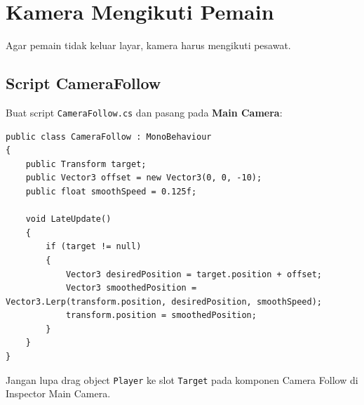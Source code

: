 
\section{Kamera Mengikuti Pemain}

Agar pemain tidak keluar layar, kamera harus mengikuti pesawat. 

\subsection{Script CameraFollow}
Buat script \texttt{CameraFollow.cs} dan pasang pada \textbf{Main Camera}:

\begin{lstlisting}[language={[Sharp]C}]
public class CameraFollow : MonoBehaviour
{
    public Transform target;
    public Vector3 offset = new Vector3(0, 0, -10);
    public float smoothSpeed = 0.125f;

    void LateUpdate()
    {
        if (target != null)
        {
            Vector3 desiredPosition = target.position + offset;
            Vector3 smoothedPosition = Vector3.Lerp(transform.position, desiredPosition, smoothSpeed);
            transform.position = smoothedPosition;
        }
    }
}
\end{lstlisting}

\begin{tips}
Jangan lupa drag object \texttt{Player} ke slot \texttt{Target} pada komponen Camera Follow di Inspector Main Camera.
\end{tips}
